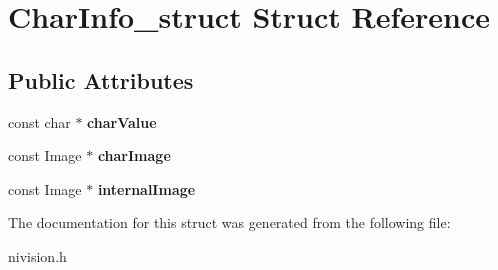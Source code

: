 \hypertarget{structCharInfo__struct}{
\section{CharInfo\_\-struct Struct Reference}
\label{structCharInfo__struct}
}
\subsection*{Public Attributes}
\begin{DoxyCompactItemize}
\item 
\hypertarget{structCharInfo__struct_a2ce78e6a0fa0c1843353273850ea6211}{
const char $\ast$ {\bfseries charValue}}
\label{structCharInfo__struct_a2ce78e6a0fa0c1843353273850ea6211}

\item 
\hypertarget{structCharInfo__struct_ad087d6c2213e2a42050f87e5284a37da}{
const Image $\ast$ {\bfseries charImage}}
\label{structCharInfo__struct_ad087d6c2213e2a42050f87e5284a37da}

\item 
\hypertarget{structCharInfo__struct_a81032de443b4aca64eeb867113e3f953}{
const Image $\ast$ {\bfseries internalImage}}
\label{structCharInfo__struct_a81032de443b4aca64eeb867113e3f953}

\end{DoxyCompactItemize}


The documentation for this struct was generated from the following file:\begin{DoxyCompactItemize}
\item 
nivision.h\end{DoxyCompactItemize}
